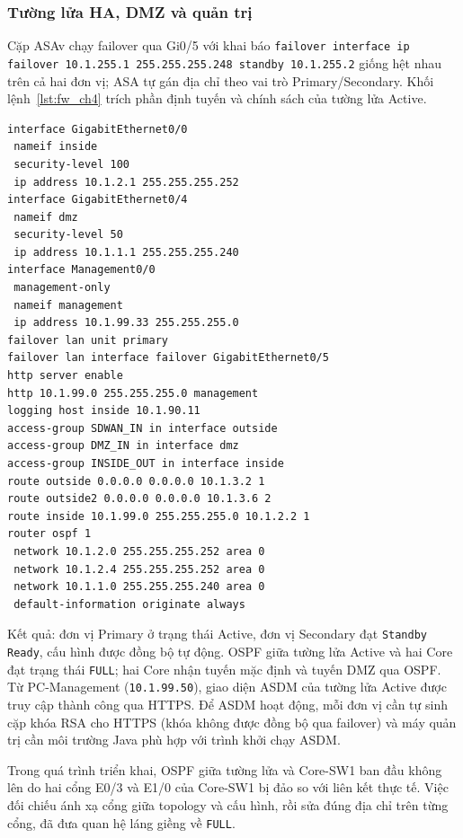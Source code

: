 \subsubsection{Tường lửa HA, DMZ và quản trị}

Cặp ASAv chạy failover qua Gi0/5 với khai báo \texttt{failover interface ip failover 10.1.255.1 255.255.255.248 standby 10.1.255.2} giống hệt nhau trên cả hai đơn vị; ASA tự gán địa chỉ theo vai trò Primary/Secondary. Khối lệnh~\ref{lst:fw_ch4} trích phần định tuyến và chính sách của tường lửa Active.

\begin{lstlisting}[style=customcode,caption={Trích cấu hình FW-ASAv-Active},label={lst:fw_ch4}]
interface GigabitEthernet0/0
 nameif inside
 security-level 100
 ip address 10.1.2.1 255.255.255.252
interface GigabitEthernet0/4
 nameif dmz
 security-level 50
 ip address 10.1.1.1 255.255.255.240
interface Management0/0
 management-only
 nameif management
 ip address 10.1.99.33 255.255.255.0
failover lan unit primary
failover lan interface failover GigabitEthernet0/5
http server enable
http 10.1.99.0 255.255.255.0 management
logging host inside 10.1.90.11
access-group SDWAN_IN in interface outside
access-group DMZ_IN in interface dmz
access-group INSIDE_OUT in interface inside
route outside 0.0.0.0 0.0.0.0 10.1.3.2 1
route outside2 0.0.0.0 0.0.0.0 10.1.3.6 2
route inside 10.1.99.0 255.255.255.0 10.1.2.2 1
router ospf 1
 network 10.1.2.0 255.255.255.252 area 0
 network 10.1.2.4 255.255.255.252 area 0
 network 10.1.1.0 255.255.255.240 area 0
 default-information originate always
\end{lstlisting}

Kết quả: đơn vị Primary ở trạng thái Active, đơn vị Secondary đạt \texttt{Standby Ready}, cấu hình được đồng bộ tự động. OSPF giữa tường lửa Active và hai Core đạt trạng thái \texttt{FULL}; hai Core nhận tuyến mặc định và tuyến DMZ qua OSPF. Từ PC-Management (\texttt{10.1.99.50}), giao diện ASDM của tường lửa Active được truy cập thành công qua HTTPS. Để ASDM hoạt động, mỗi đơn vị cần tự sinh cặp khóa RSA cho HTTPS (khóa không được đồng bộ qua failover) và máy quản trị cần môi trường Java phù hợp với trình khởi chạy ASDM.

Trong quá trình triển khai, OSPF giữa tường lửa và Core-SW1 ban đầu không lên do hai cổng E0/3 và E1/0 của Core-SW1 bị đảo so với liên kết thực tế. Việc đối chiếu ánh xạ cổng giữa topology và cấu hình, rồi sửa đúng địa chỉ trên từng cổng, đã đưa quan hệ láng giềng về \texttt{FULL}.

